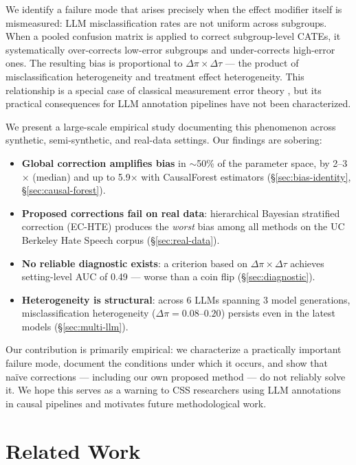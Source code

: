 \documentclass[11pt]{article}
\begin{document}
We identify a failure mode that arises precisely when the effect modifier itself is mismeasured: LLM misclassification rates are not uniform across subgroups.
When a pooled confusion matrix is applied to correct subgroup-level CATEs, it systematically over-corrects low-error subgroups and under-corrects high-error ones.
The resulting bias is proportional to $\Delta\pi \times \Delta\tau$ --- the product of misclassification heterogeneity and treatment effect heterogeneity.
This relationship is a special case of classical measurement error theory \cite{carroll2006measurement,fuller1987measurement}, but its practical consequences for LLM annotation pipelines have not been characterized.

We present a large-scale empirical study documenting this phenomenon across synthetic, semi-synthetic, and real-data settings.
Our findings are sobering:

\begin{itemize}
\item \textbf{Global correction amplifies bias} in $\sim$50\% of the parameter space, by 2--3$\times$ (median) and up to 5.9$\times$ with CausalForest estimators (\S\ref{sec:bias-identity}, \S\ref{sec:causal-forest}).
\item \textbf{Proposed corrections fail on real data}: hierarchical Bayesian stratified correction (EC-HTE) produces the \emph{worst} bias among all methods on the UC Berkeley Hate Speech corpus (\S\ref{sec:real-data}).
\item \textbf{No reliable diagnostic exists}: a criterion based on $\Delta\pi \times \Delta\tau$ achieves setting-level AUC of 0.49 --- worse than a coin flip (\S\ref{sec:diagnostic}).
\item \textbf{Heterogeneity is structural}: across 6 LLMs spanning 3 model generations, misclassification heterogeneity ($\Delta\pi = 0.08$--$0.20$) persists even in the latest models (\S\ref{sec:multi-llm}).
\end{itemize}

Our contribution is primarily empirical: we characterize a practically important failure mode, document the conditions under which it occurs, and show that na\"ive corrections --- including our own proposed method --- do not reliably solve it.
We hope this serves as a warning to CSS researchers using LLM annotations in causal pipelines and motivates future methodological work.

\section{Related Work}
\label{sec:related}
\end{document}
